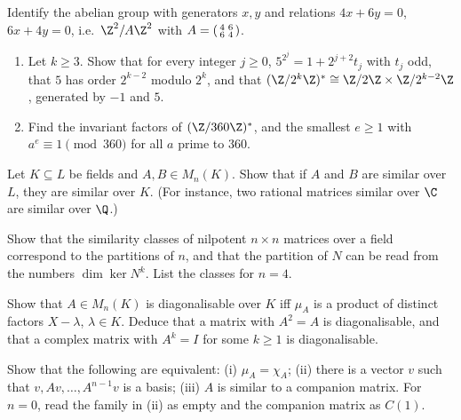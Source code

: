 \begin{exercise}[$\star$]\label{ex:smithcalc}
Identify the abelian group with generators $x,y$ and relations $4x+6y=0$, $6x+4y=0$, i.e.\ $\Z^2/A\Z^2$ with $A=\begin{psmallmatrix}4&6\\6&4\end{psmallmatrix}$.
\end{exercise}

\begin{exercise}[$\star\star$]\label{ex:unitsmodn}
\begin{enumerate}[label=(\alph*)]
\item Let $k\ge3$. Show that for every integer $j\ge0$, $5^{2^j}=1+2^{j+2}t_j$ with $t_j$ odd, that $5$ has order $2^{k-2}$ modulo $2^k$, and that $(\Z/2^k\Z)^*\cong\Z/2\Z\times\Z/2^{k-2}\Z$, generated by $-1$ and $5$.
\item Find the invariant factors of $(\Z/360\Z)^*$, and the smallest $e\ge1$ with $a^e\equiv1\pmod{360}$ for all $a$ prime to $360$.
\end{enumerate}
\end{exercise}

\begin{exercise}[$\star\star$]\label{ex:similarQ}
Let $K\subseteq L$ be fields and $A,B\in M_n(K)$. Show that if $A$ and $B$ are similar over $L$, they are similar over $K$. (For instance, two rational matrices similar over $\C$ are similar over $\Q$.)
\end{exercise}

\begin{exercise}[$\star\star$]\label{ex:nilpotent}
Show that the similarity classes of nilpotent $n\times n$ matrices over a field correspond to the partitions of $n$, and that the partition of $N$ can be read from the numbers $\dim\ker N^k$. List the classes for $n=4$.
\end{exercise}

\begin{exercise}[$\star\star$]\label{ex:diagonalisable}
Show that $A\in M_n(K)$ is diagonalisable over $K$ iff $\mu_A$ is a product of distinct factors $X-\lambda$, $\lambda\in K$. Deduce that a matrix with $A^2=A$ is diagonalisable, and that a complex matrix with $A^k=I$ for some $k\ge1$ is diagonalisable.
\end{exercise}

\begin{exercise}[$\star\star$]\label{ex:cyclicvector}
Show that the following are equivalent: (i) $\mu_A=\chi_A$; (ii) there is a vector $v$ such that $v,Av,\dots,A^{n-1}v$ is a basis; (iii) $A$ is similar to a companion matrix.
For $n=0$, read the family in (ii) as empty and the companion matrix as $C(1)$.
\end{exercise}

